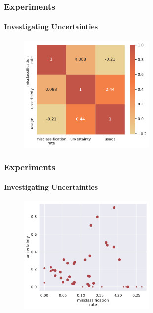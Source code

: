 \documentclass[9pt]{beamer}
\begin{document}
\begin{frame}	
\frametitle{Experiments}
\framesubtitle{Investigating Uncertainties}
	\begin{figure}
		\centering
		\includegraphics[width=0.6\textwidth]{images/corr_matrix.pdf}
	\end{figure}
\end{frame}




\begin{frame}	
\frametitle{Experiments}
\framesubtitle{Investigating Uncertainties}
	\begin{figure}
		\centering
		\includegraphics[width=0.6\textwidth]{images/error_sigma_corr_all.pdf} 
	\end{figure}
\end{frame} 
\end{document}
